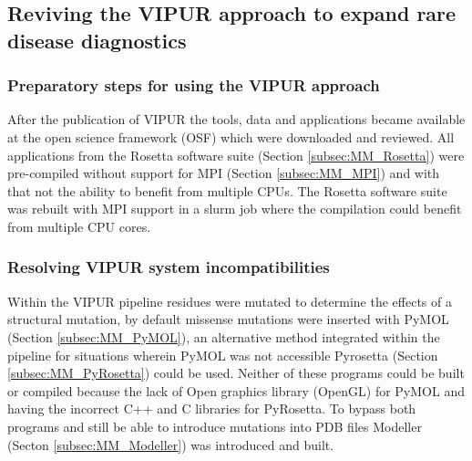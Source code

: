 \subsection{Reviving the VIPUR approach to expand rare disease diagnostics}
	\subsubsection{Preparatory steps for using the VIPUR approach}
		After the publication of VIPUR the tools, data and applications became available at the open science framework (OSF) \cite{baugh_vipur:_2015} which were downloaded and reviewed. All applications from the Rosetta software suite (Section \ref{subsec:MM_Rosetta}) were pre-compiled without support for MPI (Section \ref{subsec:MM_MPI}) and with that not the ability to benefit from multiple CPUs. The Rosetta software suite was rebuilt with MPI support in a slurm job where the compilation could benefit from multiple CPU cores.
	\label{subsubsec:RES_Prepare}
	
	\subsubsection{Resolving VIPUR system incompatibilities}
	Within the VIPUR pipeline residues were mutated to determine the effects of a structural mutation, by default missense mutations were inserted with PyMOL (Section \ref{subsec:MM_PyMOL}), an alternative method integrated within the pipeline for situations wherein PyMOL was not accessible Pyrosetta (Section \ref{subsec:MM_PyRosetta}) could be used. Neither of these programs could be built or compiled because the lack of Open graphics library (OpenGL) for PyMOL and having the incorrect C++ and C libraries for PyRosetta. To bypass both programs and still be able to introduce mutations into PDB files Modeller (Secton \ref{subsec:MM_Modeller}) was introduced and built.
	
